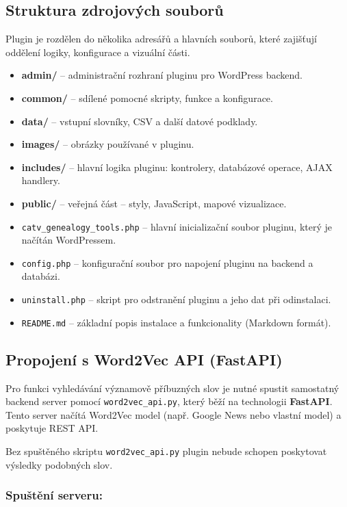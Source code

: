 \documentclass[czech, ba, kiv, he]{fasthesis}
\begin{document}
\subsection*{Struktura zdrojových souborů}

Plugin je rozdělen do několika adresářů a hlavních souborů, které zajišťují oddělení logiky, konfigurace a vizuální části.

\begin{itemize}
    \item \textbf{admin/} – administrační rozhraní pluginu pro WordPress backend.
    \item \textbf{common/} – sdílené pomocné skripty, funkce a konfigurace.
    \item \textbf{data/} – vstupní slovníky, CSV a další datové podklady.
    \item \textbf{images/} – obrázky používané v pluginu.
    \item \textbf{includes/} – hlavní logika pluginu: kontrolery, databázové operace, AJAX handlery.
    \item \textbf{public/} – veřejná část – styly, JavaScript, mapové vizualizace.
    \item \texttt{catv\_genealogy\_tools.php} – hlavní inicializační soubor pluginu, který je načítán WordPressem.
    \item \texttt{config.php} – konfigurační soubor pro napojení pluginu na backend a databázi.
    \item \texttt{uninstall.php} – skript pro odstranění pluginu a jeho dat při odinstalaci.
    \item \texttt{README.md} – základní popis instalace a funkcionality (Markdown formát).
\end{itemize}

\subsection{Propojení s Word2Vec API (FastAPI)}

Pro funkci vyhledávání významově příbuzných slov je nutné spustit samostatný backend server pomocí \texttt{word2vec\_api.py}, který běží na technologii \textbf{FastAPI}. Tento server načítá Word2Vec model (např. Google News nebo vlastní model) a poskytuje REST API.

Bez spuštěného skriptu \texttt{word2vec\_api.py} plugin nebude schopen poskytovat výsledky podobných slov.

\subsubsection*{Spuštění serveru:}
\end{document}

